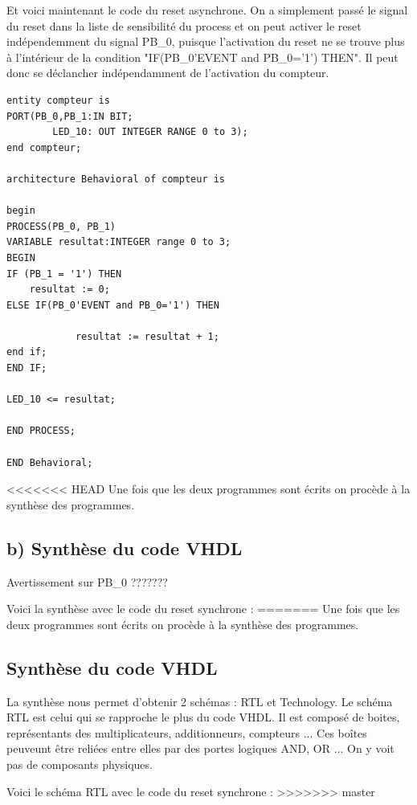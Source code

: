 \documentclass[11pt]{report}
\begin{document}
Et voici maintenant le code du reset asynchrone. On a simplement passé le signal du reset dans la liste de sensibilité du process et on peut activer le reset indépendemment du signal PB\_0, puisque l'activation du reset ne se trouve plus à l'intérieur de la condition "IF(PB\_0'EVENT and PB\_0='1') THEN". Il peut donc se déclancher indépendamment de l'activation du compteur.


\begin{lstlisting}
entity compteur is
PORT(PB_0,PB_1:IN BIT;
		LED_10: OUT INTEGER RANGE 0 to 3);
end compteur;

architecture Behavioral of compteur is

begin
PROCESS(PB_0, PB_1)
VARIABLE resultat:INTEGER range 0 to 3;
BEGIN
IF (PB_1 = '1') THEN
	resultat := 0;
ELSE IF(PB_0'EVENT and PB_0='1') THEN

			resultat := resultat + 1;
end if;
END IF;

LED_10 <= resultat;

END PROCESS;

END Behavioral;

\end{lstlisting}

<<<<<<< HEAD
Une fois que les deux programmes sont écrits on procède à la synthèse des programmes.

 \subsection{ b) Synthèse du code VHDL }

 Avertissement sur PB\_0 ???????

 Voici la synthèse avec le code du reset synchrone :
=======
Une fois que les deux programmes sont écrits on procède à la synthèse des programmes. 

 \subsection{ Synthèse du code VHDL }
 
La synthèse nous permet d'obtenir 2 schémas : RTL et Technology. Le schéma RTL est celui qui se rapproche le plus du code VHDL. Il est composé de boites, représentants des multiplicateurs, additionneurs, compteurs ... Ces boîtes peuveunt être reliées entre elles par des portes logiques AND, OR ...  On y voit pas de composants physiques. 
 
 Voici le schéma RTL avec le code du reset synchrone :
>>>>>>> master
\end{document}
